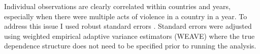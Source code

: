 \documentclass[a4paper]{article}\usepackage{graphicx, color}
\begin{document}
Individual observations are clearly correlated within countries and years, especially when there were multiple acts of violence in a country in a year. To address this issue I used robust standard errors \citep{Golder2006, Mainwaring2007}. Standard errors were adjusted using \cite{Lumley1999} weighted empirical adaptive variance estimators (WEAVE) where the true dependence structure does not need to be specified prior to running the analysis. 

\end{document}
